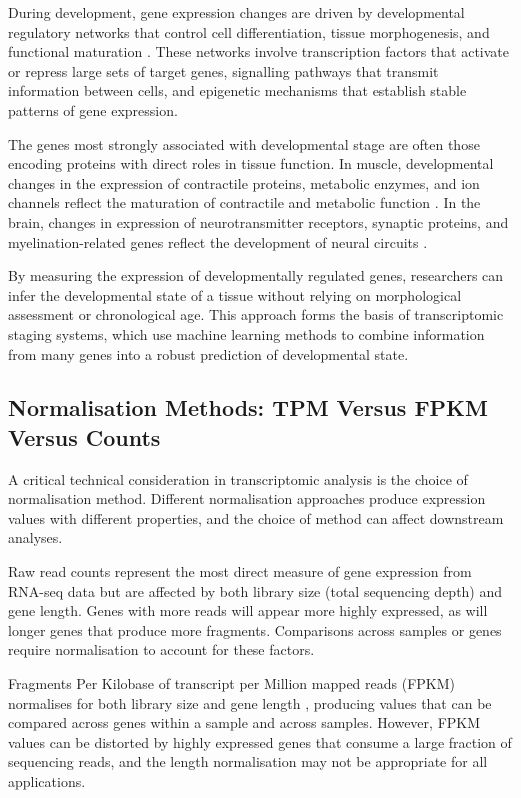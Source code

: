 During development, gene expression changes are driven by developmental regulatory networks that control cell differentiation, tissue morphogenesis, and functional maturation \parencite{cardoso-moreira_gene_2019}. These networks involve transcription factors that activate or repress large sets of target genes, signalling pathways that transmit information between cells, and epigenetic mechanisms that establish stable patterns of gene expression.

The genes most strongly associated with developmental stage are often those encoding proteins with direct roles in tissue function. In muscle, developmental changes in the expression of contractile proteins, metabolic enzymes, and ion channels reflect the maturation of contractile and metabolic function \parencite{lefaucheur_second_2010}. In the brain, changes in expression of neurotransmitter receptors, synaptic proteins, and myelination-related genes reflect the development of neural circuits \parencite{kang_spatio-temporal_2011}.

By measuring the expression of developmentally regulated genes, researchers can infer the developmental state of a tissue without relying on morphological assessment or chronological age. This approach forms the basis of transcriptomic staging systems, which use machine learning methods to combine information from many genes into a robust prediction of developmental state.

\subsection{Normalisation Methods: TPM Versus FPKM Versus Counts}

A critical technical consideration in transcriptomic analysis is the choice of normalisation method. Different normalisation approaches produce expression values with different properties, and the choice of method can affect downstream analyses.

Raw read counts represent the most direct measure of gene expression from RNA-seq data but are affected by both library size (total sequencing depth) and gene length. Genes with more reads will appear more highly expressed, as will longer genes that produce more fragments. Comparisons across samples or genes require normalisation to account for these factors.

Fragments Per Kilobase of transcript per Million mapped reads (FPKM) normalises for both library size and gene length \parencite{mortazavi_mapping_2008}, producing values that can be compared across genes within a sample and across samples. However, FPKM values can be distorted by highly expressed genes that consume a large fraction of sequencing reads, and the length normalisation may not be appropriate for all applications.

